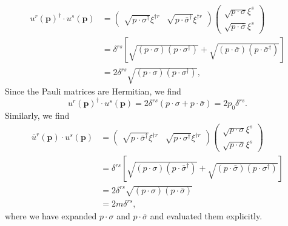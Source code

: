\begin{solution}
    \begin{equation}
    \begin{aligned}
     u^r(\mathbf{p})^\dagger\cdot u^s(\mathbf{p}) &= \begin{pmatrix}
         \sqrt{p\cdot \sigma^\dagger}\xi^{\dagger r}&\sqrt{p\cdot\bar{\sigma}^\dagger}\xi^{\dagger r}
     \end{pmatrix}
     \begin{pmatrix}
         \sqrt{p\cdot \sigma}\xi^s\\\sqrt{p\cdot\bar{\sigma}}\xi^s
     \end{pmatrix}\\
     &=\delta^{rs}\left[\sqrt{(p\cdot\sigma)(p\cdot\sigma^\dagger)} + \sqrt{(p\cdot\bar\sigma)(p\cdot\bar\sigma^\dagger)}\right]\\
     &=2\delta^{rs}\sqrt{(p\cdot\sigma)(p\cdot\sigma^\dagger)},
    \end{aligned}
    \end{equation}    
    Since the Pauli matrices are Hermitian, we find
    \begin{equation}
        u^r(\mathbf{p})^\dagger\cdot u^s(\mathbf{p}) = 2\delta^{rs}(p\cdot\sigma +p\cdot\bar\sigma ) = 2p_0\delta^{rs}.
    \end{equation}
    Similarly, we find
    \begin{equation}
        \begin{aligned}
        \bar u^r(\mathbf{p})\cdot u^s(\mathbf{p}) &= \begin{pmatrix}
         \sqrt{p\cdot\bar{\sigma}^\dagger}\xi^{\dagger r}&\sqrt{p\cdot \sigma^\dagger}\xi^{\dagger r}
     \end{pmatrix}
     \begin{pmatrix}
         \sqrt{p\cdot \sigma}\xi^s\\\sqrt{p\cdot\bar{\sigma}}\xi^s
     \end{pmatrix}\\
     &=\delta^{rs}\left[\sqrt{(p\cdot\sigma)(p\cdot\bar\sigma^\dagger)} + \sqrt{(p\cdot\bar\sigma)(p\cdot\sigma^\dagger)}\right]\\
     &=2\delta^{rs}\sqrt{(p\cdot\sigma)(p\cdot\bar\sigma)}\\
     &=2m\delta^{rs},
    \end{aligned}
    \end{equation}
    where we have expanded $p\cdot\sigma$ and $p\cdot\bar\sigma$ and evaluated them explicitly.


\end{solution}
